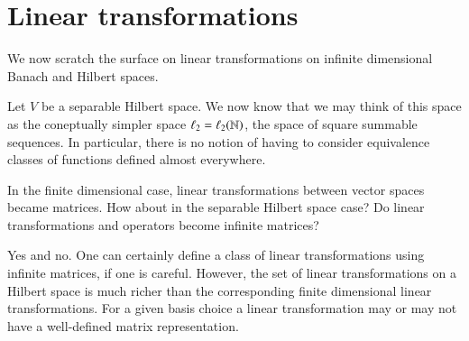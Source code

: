 


\section{Linear transformations}

We now scratch the surface on linear transformations on infinite dimensional Banach and Hilbert spaces.
    
Let $V$ be a separable Hilbert space. We now know that we may think of this space as the coneptually simpler space $\ell_2 = \ell_2(\mathbb{N})$, the space of square summable sequences. In particular, there is no notion of having to consider equivalence classes of functions defined almost everywhere.

In the finite dimensional case, linear transformations between vector spaces became matrices. How about in the separable Hilbert space case? Do linear transformations and operators become infinite matrices?

Yes and no. One can certainly define a class of linear transformations using infinite matrices, if one is careful. However, the set of linear transformations on a Hilbert space is much richer than the corresponding finite dimensional linear transformations. For a given basis choice a linear transformation may or may not have a well-defined matrix representation.


